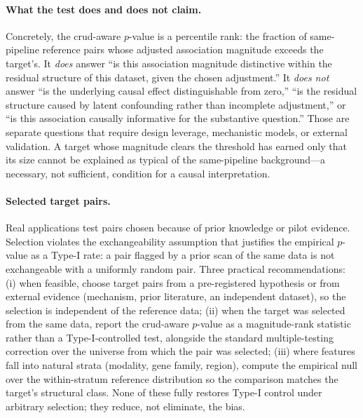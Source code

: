 \paragraph{What the test does and does not claim.} Concretely, the crud-aware $p$-value is a percentile rank: the fraction of same-pipeline reference pairs whose adjusted association magnitude exceeds the target's. It \emph{does} answer ``is this association magnitude distinctive within the residual structure of this dataset, given the chosen adjustment.'' It \emph{does not} answer ``is the underlying causal effect distinguishable from zero,'' ``is the residual structure caused by latent confounding rather than incomplete adjustment,'' or ``is this association causally informative for the substantive question.'' Those are separate questions that require design leverage, mechanistic models, or external validation. A target whose magnitude clears the threshold has earned only that its size cannot be explained as typical of the same-pipeline background---a necessary, not sufficient, condition for a causal interpretation.

\paragraph{Selected target pairs.} Real applications test pairs chosen because of prior knowledge or pilot evidence. Selection violates the exchangeability assumption that justifies the empirical $p$-value as a Type-I rate: a pair flagged by a prior scan of the same data is not exchangeable with a uniformly random pair. Three practical recommendations: (i) when feasible, choose target pairs from a pre-registered hypothesis or from external evidence (mechanism, prior literature, an independent dataset), so the selection is independent of the reference data; (ii) when the target was selected from the same data, report the crud-aware $p$-value as a magnitude-rank statistic rather than a Type-I-controlled test, alongside the standard multiple-testing correction over the universe from which the pair was selected; (iii) where features fall into natural strata (modality, gene family, region), compute the empirical null over the within-stratum reference distribution so the comparison matches the target's structural class. None of these fully restores Type-I control under arbitrary selection; they reduce, not eliminate, the bias.

